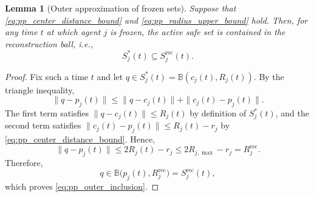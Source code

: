 \documentclass[10pt,a4paper]{amsart}
\newtheorem{lemma}{Lemma}
\begin{document}
\begin{lemma}[Outer approximation of frozen sets]
\label{lem:pp_outer_approx_frozen}
Suppose that \eqref{eq:pp_center_distance_bound} and \eqref{eq:pp_radius_upper_bound} hold.
Then, for any time $t$ at which agent $j$ is frozen, the active safe set is contained in the reconstruction ball, i.e.,
\begin{equation}
S_j^\ast(t)\subseteq S_j^{\mathrm{rec}}(t).
\label{eq:pp_outer_inclusion}
\end{equation}
\end{lemma}

\begin{proof}
Fix such a time $t$ and let $q\in S_j^\ast(t)=\mathbb B(c_j(t),R_j(t))$.
By the triangle inequality,
\[
\|q-p_j(t)\|
\le
\|q-c_j(t)\|+\|c_j(t)-p_j(t)\|.
\]
The first term satisfies $\|q-c_j(t)\|\le R_j(t)$ by definition of $S_j^\ast(t)$, and the second term satisfies $\|c_j(t)-p_j(t)\|\le R_j(t)-r_j$
by \eqref{eq:pp_center_distance_bound}.
Hence,
\[
\|q-p_j(t)\|
\le
2R_j(t)-r_j
\le
2R_{j,\max}-r_j
=
R_j^{\mathrm{rec}}.
\]
Therefore,
\[
q\in \mathbb B\bigl(p_j(t),R_j^{\mathrm{rec}}\bigr)=S_j^{\mathrm{rec}}(t),
\]
which proves \eqref{eq:pp_outer_inclusion}.
\end{proof}
\end{document}
